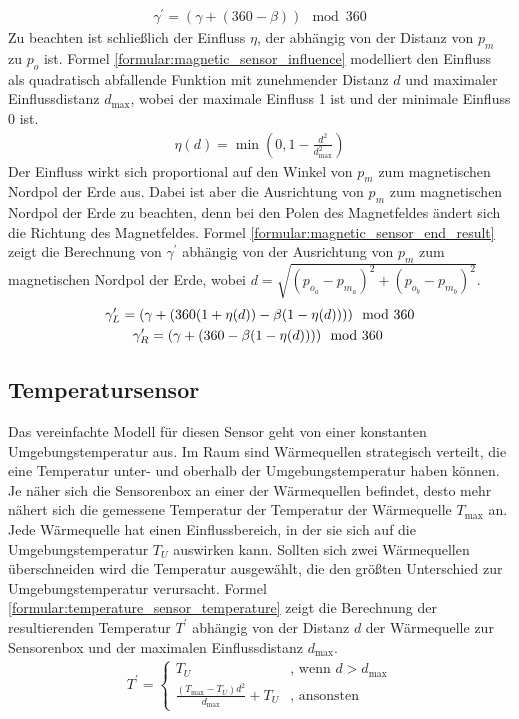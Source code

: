 \begin{align}
    \label{formular:magnetic_sensor_new_heading}
    \gamma^{\prime} = (\gamma + (360 - \beta))\mod 360
\end{align}
\newpage
Zu beachten ist schließlich der Einfluss $\eta$, der abhängig von der Distanz von $p_{m}$ zu $p_{o}$ ist.
Formel \ref{formular:magnetic_sensor_influence} modelliert den Einfluss als quadratisch abfallende Funktion mit zunehmender Distanz $d$ und maximaler Einflussdistanz $d_{\max}$,
wobei der maximale Einfluss 1 ist und der minimale Einfluss 0 ist.
\begin{align}
    \label{formular:magnetic_sensor_influence}
    \eta(d) = \min(0, 1 - \frac{d^2}{d_{\max}^2})
\end{align}
Der Einfluss wirkt sich proportional auf den Winkel von $p_{m}$ zum magnetischen Nordpol der Erde aus.
Dabei ist aber die Ausrichtung von $p_{m}$ zum magnetischen Nordpol der Erde zu beachten, denn bei den Polen des Magnetfeldes ändert sich die Richtung des Magnetfeldes.
Formel \ref{formular:magnetic_sensor_end_result} zeigt die Berechnung von $\gamma^{\prime}$ abhängig von der Ausrichtung von $p_{m}$ zum magnetischen Nordpol der Erde,
wobei $d = \sqrt{(p_{o_a} - p_{m_a})^2 + (p_{o_b} - p_{m_b})^2}$.
\begin{align}
    \label{formular:magnetic_sensor_end_result}
    \gamma^{\prime}_L = (\gamma + (360(1 + \eta(d)) - \beta(1 - \eta(d))))\mod 360 \\\nonumber
    \gamma^{\prime}_R = (\gamma + (360 - \beta(1 - \eta(d))))\mod 360 \hspace{0.8cm}
\end{align}

\subsection{Temperatursensor}
Das vereinfachte Modell für diesen Sensor geht von einer konstanten Umgebungstemperatur aus.
Im Raum sind Wärmequellen strategisch verteilt, die eine Temperatur unter- und oberhalb der Umgebungstemperatur haben können.
Je näher sich die Sensorenbox an einer der Wärmequellen befindet, desto mehr nähert sich die gemessene Temperatur der Temperatur der Wärmequelle $T_{\max}$ an.
\newline
\newline
Jede Wärmequelle hat einen Einflussbereich, in der sie sich auf die Umgebungstemperatur $T_U$ auswirken kann.
Sollten sich zwei Wärmequellen überschneiden wird die Temperatur ausgewählt, die den größten Unterschied zur Umgebungstemperatur verursacht.
Formel \ref{formular:temperature_sensor_temperature} zeigt die Berechnung der resultierenden Temperatur $T^{\prime}$ abhängig von der Distanz $d$ der
Wärmequelle zur Sensorenbox und der maximalen Einflussdistanz $d_{\max}$.
\begin{align}
    \label{formular:temperature_sensor_temperature}
    T^{\prime} = \begin{cases}
                     T_U & \text{, wenn } d > d_{\max} \\
                     \frac{(T_{\max} - T_U)d^2}{d_{\max}} + T_U & \text{, ansonsten}
    \end{cases}
\end{align}

